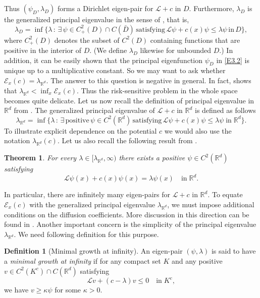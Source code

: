 \documentclass[notitlepage,11pt,reqno]{amsart}
\numberwithin{equation}{section}
\theoremstyle{plain}
\newtheorem{theorem}{Theorem}[section]
\theoremstyle{definition}
\newtheorem{definition}{Definition}[section]
\theoremstyle{remark}
\newcommand{\sE}{{\mathscr{E}}}     %
\newcommand{\sL}{{\mathscr{L}}}
\newcommand{\Rd}{{\mathds{R}^{d}}}
\begin{document}
Thus $(\psi_D, \lambda_D)$ forms a Dirichlet eigen-pair for $\sL+c$ in $D$. Furthermore, $\lambda_D$ is the generalized principal
eigenvalue in the sense of \cite{MR1258192,NP92,PW66}, that is, 
\begin{equation}\label{E-prin}
\lambda_D=\inf\{\lambda\, :\, \exists\, \psi\in C^2_+(D)\cap C(\bar{D})\, \text{satisfying} \, \sL\psi + c(x)\psi\leq \lambda\psi\, \text{in}\, D  \},
\end{equation}
where $C^2_+(D)$ denotes the subset of $C^2(D)$ containing functions that are positive in the interior of $D$. (We define $\lambda_D$ likewise for unbounded $D$.) In addition, it can be easily shown that
the principal eigenfunction $\psi_D$ in \eqref{E3.2} is unique up to a multiplicative constant. So we may want to ask whether $\sE_x(c)=\lambda_{\Rd}$. The answer to this question is negative in general. In fact, \cite[Example~3.1]{MR3926044} shows that
$\lambda_{\Rd} < \inf_x \sE_x(c)$. Thus the risk-sensitive problem in the whole space becomes quite delicate. Let us now recall the 
definition of principal eigenvalue in $\Rd$ from \cite{MR3340379}. The generalized principal eigenvalue of $\sL+c$ in $\Rd$ is defined as follows
\begin{equation}\label{A02}
\lambda_{\Rd}=\inf\{\lambda\, :\, \exists\, \text{positive}\, \psi\in C^2(\Rd)\, \text{satisfying} \, \sL\psi + c(x)\psi\leq \lambda\psi\; \text{in}\; \Rd  \}.
\end{equation}
To illustrate explicit dependence on the potential $c$ we would also use the notation $\lambda_{\Rd}(c)$.
Let us also recall the following result from \cite[Theorem~1.4]{MR3340379}.
\begin{theorem}\label{T3.1}
For every $\lambda\in [\lambda_{\Rd}, \infty)$ there exists a positive $\psi\in C^2(\Rd)$ satisfying 
$$\sL\psi(x) + c(x)\psi(x) =\lambda \psi(x) \quad \text{in}\; \Rd.$$
\end{theorem}
In particular, there are infinitely many eigen-pairs for $\sL+c$ in $\Rd$. To equate  $\sE_x(c)$ with the generalized principal eigenvalue $\lambda_{\Rd}$, we must impose
additional conditions on the diffusion coefficients. More discussion in this direction can be found in \cite{MR3926044}. Another important concern is the simplicity of the principal eigenvalue
$\lambda_{\Rd}$. We need following definition for this purpose.
\begin{definition}[Minimal growth at infinity]
An eigen-pair $(\psi, \lambda)$ is said to have a {\it minimal growth at infinity} if for any compact set $K$ and any positive $v\in C^2(K^c)\cap C(\Rd)$ satisfying
$$\sL v + (c-\lambda) v\leq 0 \quad\text{in} \; K^c,$$
we have $v\geq \kappa \psi$ for some $\kappa>0$.
\end{definition}
\end{document}
